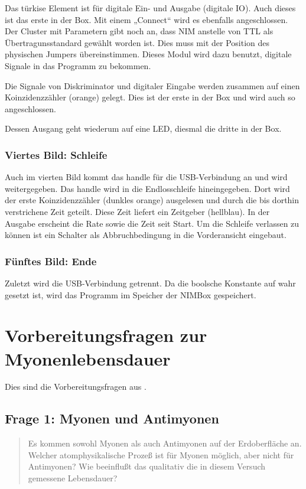 \documentclass[11pt, ngerman, fleqn, DIV=15, headinclude, BCOR=2cm]{scrreprt}
\begin{document}
Das türkise Element ist für digitale Ein- und Ausgabe (digitale IO). Auch
dieses ist das erste in der Box. Mit einem „Connect“ wird es ebenfalls
angeschlossen. Der Cluster mit Parametern gibt noch an, dass NIM anstelle von
TTL als Übertragunsstandard gewählt worden ist. Dies muss mit der Position des
physischen Jumpers übereinstimmen. Dieses Modul wird dazu benutzt, digitale
Signale in das Programm zu bekommen.

Die Signale von Diskriminator und digitaler Eingabe werden zusammen auf einen
Koinzidenzzähler (orange) gelegt. Dies ist der erste in der Box und wird auch
so angeschlossen.

Dessen Ausgang geht wiederum auf eine LED, diesmal die dritte in der Box.

\subsubsection{Viertes Bild: Schleife}

Auch im vierten Bild kommt das handle für die USB-Verbindung an und wird
weitergegeben. Das handle wird in die Endlosschleife hineingegeben. Dort wird
der erste Koinzidenzzähler (dunkles orange) ausgelesen und durch die bis
dorthin verstrichene Zeit geteilt. Diese Zeit liefert ein Zeitgeber (hellblau).
In der Ausgabe erscheint die Rate sowie die Zeit seit Start. Um die Schleife
verlassen zu können ist ein Schalter als Abbruchbedingung in die Vorderansicht
eingebaut.

\subsubsection{Fünftes Bild: Ende}

Zuletzt wird die USB-Verbindung getrennt. Da die boolsche Konstante auf wahr
gesetzt ist, wird das Programm im Speicher der NIMBox gespeichert.

\section{Vorbereitungsfragen zur Myonenlebensdauer}

Dies sind die Vorbereitungsfragen aus \parencite[14]{physik512-Anleitung}.

\subsection{Frage 1: Myonen und Antimyonen}

\begin{quote}
    Es kommen sowohl Myonen als auch Antimyonen auf der Erdoberfläche an.
    Welcher atomphysikalische Prozeß ist für Myonen möglich, aber nicht für
    Antimyonen? Wie beeinflußt das qualitativ die in diesem Versuch gemessene
    Lebensdauer?
\end{quote}
\end{document}
